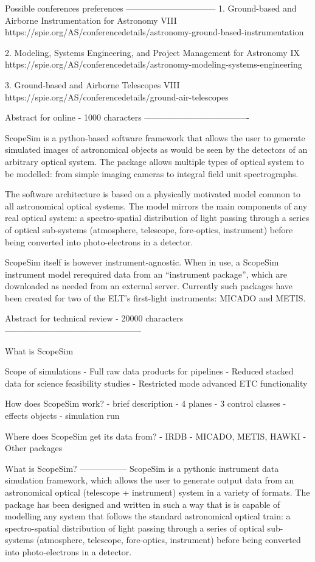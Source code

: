 Possible conferences preferences
--------------------------------
1. Ground-based and Airborne Instrumentation for Astronomy VIII
https://spie.org/AS/conferencedetails/astronomy-ground-based-instrumentation

2. Modeling, Systems Engineering, and Project Management for Astronomy IX
https://spie.org/AS/conferencedetails/astronomy-modeling-systems-engineering

3. Ground-based and Airborne Telescopes VIII
https://spie.org/AS/conferencedetails/ground-air-telescopes

Abstract for online - 1000 characters
-------------------------------------

ScopeSim is a python-based software framework that allows the user to generate
simulated images of astronomical objects as would be seen by the detectors of
an arbitrary optical system. The package allows multiple types of optical system
to be modelled: from simple imaging cameras to integral field unit spectrographs.

The software architecture is based on a physically motivated model common to all
astronomical optical systems. The model mirrors the main components of any real
optical system: a spectro-spatial distribution of light passing through a series
of optical sub-systems (atmosphere, telescope, fore-optics, instrument) before
being converted into photo-electrons in a detector.

ScopeSim itself is however instrument-agnostic. When in use, a ScopeSim
instrument model rerequired data from an ``instrument package'', which are
downloaded as needed from an external server. Currently such packages have been
created for two of the ELT's first-light instruments: MICADO and METIS.


Abstract for technical review - 20000 characters
------------------------------------------------

What is ScopeSim

Scope of simulations
- Full raw data products for pipelines
- Reduced stacked data for science feasibility studies
- Restricted mode advanced ETC functionality

How does ScopeSim work?
- brief description
- 4 planes
- 3 control classes
- effects objects
- simulation run

Where does ScopeSim get its data from?
- IRDB
- MICADO, METIS, HAWKI
- Other packages


What is ScopeSim?
-----------------
ScopeSim is a pythonic instrument data simulation framework, which allows the
user to generate output data from an astronomical optical (telescope +
instrument) system in a variety of formats. The package has been designed and
written in such a way that is is capable of modelling any system that follows
the standard astronomical optical train: a spectro-spatial distribution of light
passing through a series of optical sub-systems (atmosphere, telescope,
fore-optics, instrument) before being converted into photo-electrons in a
detector.

